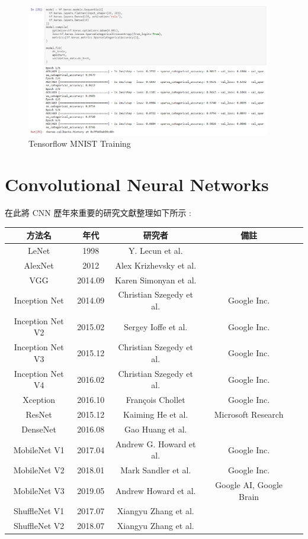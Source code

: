 \documentclass[11pt,UTF8]{ctexart}
\begin{document}
\begin{figure}[H]
\centering 
\includegraphics[width=0.95\textwidth]{t2.png} 
\caption{Tensorflow MNIST Training}
\label{Test}
\end{figure}

\newpage

\section{Convolutional Neural Networks}

在此將 CNN 歷年來重要的研究文獻整理如下所示 : 

\begin{center}
\begin{tabular}{ccccc}
\hline
方法名 & 年代 & 研究者 & 備註 \\
\hline
LeNet & 1998 & Y. Lecun et al. &  \\
AlexNet & 2012 & Alex Krizhevsky et al. &  \\
VGG & 2014.09 & Karen Simonyan et al. &  \\
Inception Net & 2014.09 & Christian Szegedy et al. & Google Inc. \\
Inception Net V2 & 2015.02 & Sergey Ioffe et al. & Google Inc. \\
Inception Net V3 & 2015.12 & Christian Szegedy et al. & Google Inc. \\
Inception Net V4 & 2016.02 & Christian Szegedy et al. & Google Inc. \\
Xception & 2016.10 & François Chollet & Google Inc. \\
ResNet & 2015.12 & Kaiming He et al. & Microsoft Research \\
DenseNet & 2016.08 & Gao Huang et al. &  \\
MobileNet V1 & 2017.04 & Andrew G. Howard et al. & Google Inc. \\
MobileNet V2 & 2018.01 & Mark Sandler et al. & Google Inc. \\
MobileNet V3 & 2019.05 & Andrew Howard et al. & Google AI, Google Brain \\
ShuffleNet V1 & 2017.07 & Xiangyu Zhang et al. & \\
ShuffleNet V2 & 2018.07 & Xiangyu Zhang et al.  & \\
\hline
\end{tabular}
\end{center}
\end{document}
